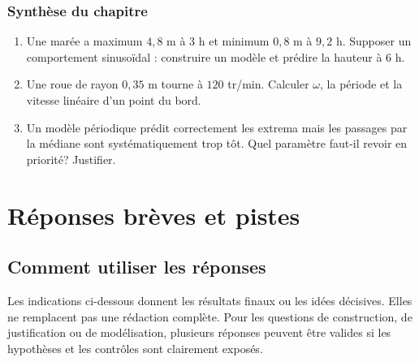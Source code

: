 \documentclass[11pt,a4paper,openany]{book}
\newenvironment{synthesisbox}{\begin{tcolorbox}[title={Problèmes de synthèse du chapitre},colback=mistgold,coltitle=gold!70!black,borderline west={2.4pt}{0pt}{gold}]\begin{enumerate}[label=\textbf{S\arabic*.}]}{\end{enumerate}\end{tcolorbox}}
\newif\ifcorrige
\begin{document}
\section*{Synthèse du chapitre}
\begin{synthesisbox}
\item Une marée a maximum $4{,}8$ m à $3$ h et minimum $0{,}8$ m à $9{,}2$ h. Supposer un comportement sinusoïdal : construire un modèle et prédire la hauteur à $6$ h.
\item Une roue de rayon $0{,}35$ m tourne à $120$ tr/min. Calculer $\omega$, la période et la vitesse linéaire d'un point du bord.
\item Un modèle périodique prédit correctement les extrema mais les passages par la médiane sont systématiquement trop tôt. Quel paramètre faut-il revoir en priorité? Justifier.
\end{synthesisbox}

\ifcorrige
\appendix
\part*{Réponses brèves et pistes}
\chapter*{Comment utiliser les réponses}
Les indications ci-dessous donnent les résultats finaux ou les idées décisives. Elles ne remplacent pas une rédaction complète. Pour les questions de construction, de justification ou de modélisation, plusieurs réponses peuvent être valides si les hypothèses et les contrôles sont clairement exposés.
\end{document}
